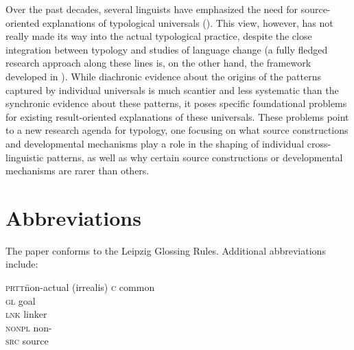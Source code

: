 \documentclass[output=paper]{langsci/langscibook}
\begin{document}
Over the past decades, several linguists have emphasized the need for
source-oriented explanations of typological universals (\citealt{Bybee1988_Diachr,Bybee2006_Univ,Bybee2008_StructPres,Aristar1991_Diachr,Gildea1998_Carib,Otareferential,Otacompetingmotivations,Otadependencies,Anderson2016_Change}). This
view, however, has not really made its way into the actual typological
practice, despite the close integration between typology and studies
of language change (a fully fledged research approach along these lines is, on
the other hand, the  framework developed in
\citealt{Blevins2004}). While diachronic evidence about the origins
of the patterns captured by individual universals is much scantier and
less systematic than the synchronic evidence about these patterns, 
 it poses specific foundational problems for existing result-oriented explanations of these universals. These problems point to a
new research agenda for typology, one  focusing on what source constructions and developmental
mechanisms play a role in the shaping of individual cross-linguistic
patterns, as well as why certain source
constructions or developmental mechanisms are rarer than others.

\section*{Abbreviations}

The paper conforms to the Leipzig Glossing Rules. Additional abbreviations include:
\begin{multicols}{2}
\begin{tabbing}
\textsc{prtt}\hspace{5mm}\=non-actual (irrealis) \hspace{5mm}\kill
\textsc{c}  \>  common                 \\
\textsc{gl} \> goal                          \\
\textsc{lnk}   \>  linker                  \\
\textsc{nonpl} \>  non- \\
\textsc{src} \>  source \\
\end{tabbing}
\end{multicols}

\sloppy
\printbibliography[heading=subbibliography,notkeyword=this] 
\end{document}
